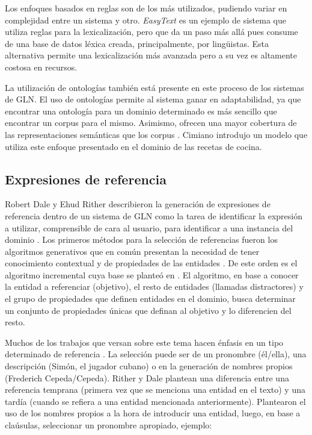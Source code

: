     Los enfoques basados en reglas son de los m\'as utilizados, pudiendo variar en complejidad entre un sistema y otro. \textit{EasyText} 
es un ejemplo de sistema que utiliza reglas para la lexicalización, pero que da un paso m\'as all\'a pues consume de una base de datos 
l\'exica creada, principalmente, por lingüistas. Esta alternativa permite una lexicalización m\'as avanzada pero a su vez es altamente 
costosa en recursos.

    La utilizaci\'on de ontolog\'ias tambi\'en est\'a presente en este proceso de los sistemas de GLN. El uso de ontologías permite 
al sistema ganar en adaptabilidad, ya que encontrar una ontología para un dominio determinado es más sencillo que encontrar un corpus para 
el mismo. Asimismo, ofrecen una mayor cobertura de las representaciones semánticas que los corpus . Cimiano  introdujo 
un modelo que utiliza este enfoque presentado en el dominio de las recetas de cocina.


\subsection{Expresiones de referencia}\label{subsection:expreferencia}

    Robert Dale y Ehud Rither describieron la generación de expresiones de referencia dentro de un sistema de GLN como la tarea de 
identificar la expresión a utilizar, comprensible de cara al usuario, para identificar a una instancia del dominio . 
Los primeros m\'etodos para la selección de referencias fueron los algoritmos generativos que en común presentan la necesidad de tener conocimiento 
contextual y de propiedades de las entidades . De este orden es el algoritmo incremental cuya base se plante\'o en . 
El algoritmo, en base a conocer la entidad a referenciar (objetivo), el resto de entidades (llamadas distractores) y el grupo de propiedades que definen entidades en el dominio,
busca determinar un conjunto de propiedades \'unicas que definan al objetivo y lo diferencien del resto.

    Muchos de los trabajos que versan sobre este tema hacen énfasis en un tipo determinado de referencia . La selección 
puede ser de un pronombre (\'el/ella), una descripci\'on (Sim\'on, el jugador cubano) o en la generación de nombres propios (Frederich Cepeda/Cepeda). 
Rither y Dale  plantean una diferencia entre una referencia temprana (primera vez que se menciona una 
entidad en el texto) y una tard\'ia (cuando se refiera a una entidad mencionada anteriormente). Plantearon el uso de los nombres propios a la hora 
de introducir una entidad, luego, en base a cla\'usulas, seleccionar un pronombre apropiado, ejemplo:

